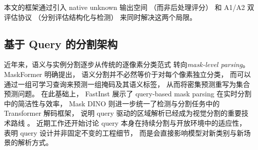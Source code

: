 \documentclass[3p,twocolumn,authoryear]{elsarticle}
\begin{document}
本文的框架通过引入 native unknown 输出空间
（而非后处理评分）
和 A1/A2 双评估协议
（分别评估结构化与检测）
来同时解决这两个局限。
 
 
 
 
\subsection{基于 Query 的分割架构}
\label{sec:rw-query}

近年来，语义与实例分割逐步从传统的逐像素分类范式
转向\emph{mask-level parsing}。
MaskFormer 明确提出，
语义分割并不必然等价于对每个像素独立分类，
而可以通过一组可学习查询来预测一组掩码及其语义标签，
从而将密集预测重写为集合预测问题\cite{cheng2021perpixel}。
在此基础上，
FastInst 展示了 query-based mask parsing 在实时分割中的简洁性与效率，
Mask DINO 则进一步统一了检测与分割任务中的 Transformer 解码框架，
说明 query 驱动的区域解析已经成为视觉分割的重要技术路线
\cite{he2023fastinstsimple,li2022maskdino}。
近期工作还开始讨论 query 本身在持续分割与开放环境中的适应性，
表明 query 设计并非固定不变的工程细节，
而是会直接影响模型对新类别与新场景的解析方式\cite{zhu2025rethinkingquery}。
\end{document}
